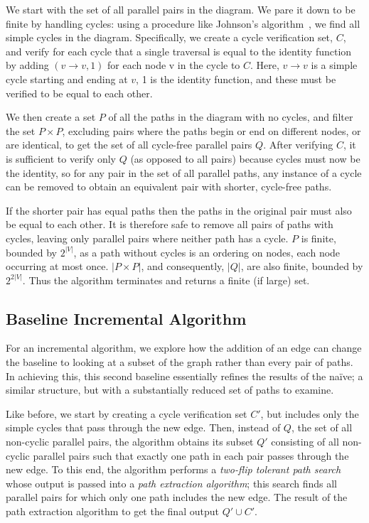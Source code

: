 \documentclass[sigplan,review,nonacm=true]{acmart}
\begin{document}
We start with the set of all parallel pairs in the diagram.
We pare it down to be finite by handling cycles: using a procedure like Johnson's algorithm~\cite{johnson}, we find all simple cycles in the diagram.
Specifically, we create a cycle verification set, $C$, and verify for each cycle that a single traversal is equal to the identity function by adding $(v \rightarrow v, 1)$ for each node v in the cycle to $C$.
Here, $v \rightarrow v$ is a simple cycle starting and ending at $v$, 1 is the identity function, and these must be verified to be equal to each other.

We then create a set $P$ of all the paths in the diagram with no cycles, and filter the set $P \times P$, excluding pairs where the paths begin or end on different nodes, or are identical, to get the set of all cycle-free parallel pairs $Q$.
After verifying $C$, it is sufficient to verify only $Q$ (as opposed to all pairs) because cycles must now be the identity, so for any pair in the set of all parallel paths, any instance of a cycle can be removed to obtain an equivalent pair with shorter, cycle-free paths.

If the shorter pair has equal paths then the paths in the original pair must also be equal to each other.
It is therefore safe to remove all pairs of paths with cycles, leaving only parallel pairs where neither path has a cycle.
$P$ is finite, bounded by $2^{|V|}$, as a path without cycles is an ordering on nodes, each node occurring at most once.
$|P \times P|$, and consequently, $|Q|$, are also finite, bounded by $2^{2|V|}$.
Thus the algorithm terminates and returns a finite (if large) set.

\subsection{Baseline Incremental Algorithm}

For an incremental algorithm, we explore how the addition of an edge can change the baseline to looking at a subset of the graph rather than every pair of paths.  In achieving this, this second baseline essentially refines the results of the na\"{i}ve; a similar structure, but with a substantially reduced set of paths to examine.

Like before, we start by creating a cycle verification set $C'$, but includes only the simple cycles that pass through the new edge.
Then, instead of $Q$, the set of all non-cyclic parallel pairs, the algorithm obtains its subset $Q'$ consisting of all non-cyclic parallel pairs such that exactly one path in each pair passes through the new edge.
To this end, the algorithm performs a \textit{two-flip tolerant path search} whose output is passed into a \textit{path extraction algorithm}; this search finds all parallel pairs for which only one path includes the new edge.
The result of the path extraction algorithm to get the final output $Q' \cup C'$.
\end{document}
